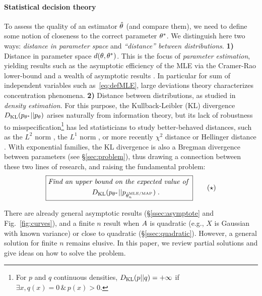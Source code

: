 \paragraph{Statistical decision theory}
To assess the quality of an estimator $\hat {\theta}$ (and compare them), we need to define some notion of closeness to the correct parameter $\theta^*$.
We distinguish here two ways: \textit{distance in parameter space} and \textit{``distance'' between distributions}.
{\bf 1)} Distance in parameter space $d(\theta,\theta^*)$. This is the focus of \emph{parameter estimation}, yielding results such as the asymptotic efficiency of the MLE via the Cramer-Rao lower-bound \citep{aitken1942estimation} and a wealth of asymptotic results \citep{vdv1998asymptotic}.
In particular for sum of independent variables such as~\eqref{eq:defMLE}, large deviations theory \citep{varadhan1984large} characterizes concentration phenomena.
{\bf 2)} Distance between distributions, as studied in \emph{density estimation}.
For this purpose, the Kullback-Leibler (KL) divergence $D_{\mathrm{KL}}(p_{\theta^*} || p_{\theta} )$  arises naturally from information theory,
but its lack of robustness to misspecification\footnote{
For $p$ and $q$ continuous densities,
$D_{\mathrm{KL}}(p||q) = +\infty$ if $\exists x, q(x)=0 \, \& \, p(x)>0$.
}
has led statisticians to study better-behaved distances, such as the $L^2$ norm \citep[\S1.2]{tsybakov2009introduction}, the $L^1$ norm \citep{devroye2001combinatorial}, 
or more recently  $\chi^2$ distance \citep{kamath2015learning} or Hellinger distance \citep{baraud2017new}.
With exponential families, the KL divergence is also a Bregman divergence between parameters (see \S\ref{sec:problem}), thus drawing a connection between these two lines of research,
and raising the fundamental problem:
\begin{equation}
\boxed{
\begin{aligned}
	\textit{Find an upper}&\textit{ bound on the expected value of } \\
	&D_{\mathrm{KL}}(p_{\theta^*} || p_{\hat {\theta}_n^\text{MLE/MAP} }) \; .
\end{aligned}
}
\tag{$\star$}
\label{problem}
\end{equation}

There are already general asymptotic results (\S\ref{ssec:asymptote} and Fig.~\ref{fig:curves}), and a finite $n$ result when $A$ is quadratic (e.g., $X$ is Gaussian with known variance)
or close to quadratic (\S\ref{ssec:quadratic}).
However, a  general solution for finite $n$ remains elusive. 
In this paper, we review partial solutions and give ideas on how to solve the problem.

